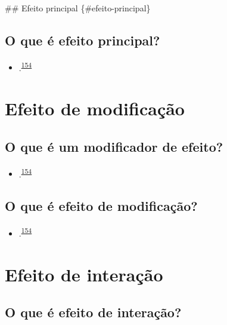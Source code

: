 \documentclass[
  a4paper,
]{book}
\providecommand{\tightlist}{%
  \setlength{\itemsep}{0pt}\setlength{\parskip}{0pt}}
\begin{document}
\#\# Efeito principal \{\#efeito-principal\}

\hypertarget{o-que-uxe9-efeito-principal}{%
\subsection{O que é efeito principal?}\label{o-que-uxe9-efeito-principal}}

\begin{itemize}
\tightlist
\item
  .\textsuperscript{\protect\hyperlink{ref-Bours2023}{154}}
\end{itemize}

\hypertarget{modificacao}{%
\section{Efeito de modificação}\label{modificacao}}

\hypertarget{o-que-uxe9-um-modificador-de-efeito}{%
\subsection{O que é um modificador de efeito?}\label{o-que-uxe9-um-modificador-de-efeito}}

\begin{itemize}
\tightlist
\item
  .\textsuperscript{\protect\hyperlink{ref-Bours2023}{154}}
\end{itemize}

\hypertarget{o-que-uxe9-efeito-de-modificauxe7uxe3o}{%
\subsection{O que é efeito de modificação?}\label{o-que-uxe9-efeito-de-modificauxe7uxe3o}}

\begin{itemize}
\tightlist
\item
  .\textsuperscript{\protect\hyperlink{ref-Bours2023}{154}}
\end{itemize}

\hypertarget{interacao}{%
\section{Efeito de interação}\label{interacao}}

\hypertarget{o-que-uxe9-efeito-de-interauxe7uxe3o}{%
\subsection{O que é efeito de interação?}\label{o-que-uxe9-efeito-de-interauxe7uxe3o}}
\end{document}

